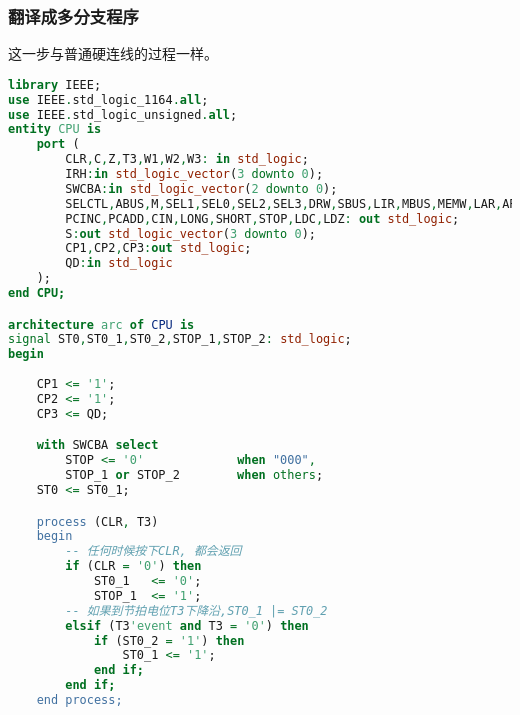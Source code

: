 \documentclass[UTF8]{ctexart}
\begin{document}
\subsubsection{翻译成多分支程序}
这一步与普通硬连线的过程一样。\\
{\firacode
\begin{lstlisting}[language={VHDL}]
library IEEE;
use IEEE.std_logic_1164.all;
use IEEE.std_logic_unsigned.all;
entity CPU is
	port (
		CLR,C,Z,T3,W1,W2,W3: in std_logic;
		IRH:in std_logic_vector(3 downto 0);
		SWCBA:in std_logic_vector(2 downto 0);
		SELCTL,ABUS,M,SEL1,SEL0,SEL2,SEL3,DRW,SBUS,LIR,MBUS,MEMW,LAR,ARINC,LPC,
		PCINC,PCADD,CIN,LONG,SHORT,STOP,LDC,LDZ: out std_logic;
		S:out std_logic_vector(3 downto 0);
		CP1,CP2,CP3:out std_logic;	
		QD:in std_logic	
	);
end CPU;

architecture arc of CPU is
signal ST0,ST0_1,ST0_2,STOP_1,STOP_2: std_logic;
begin
	
	CP1 <= '1';
	CP2 <= '1';
	CP3 <= QD;

	with SWCBA select
		STOP <= '0'             when "000",
		STOP_1 or STOP_2        when others;
	ST0 <= ST0_1;

	process (CLR, T3)
	begin
		-- 任何时候按下CLR, 都会返回
		if (CLR = '0') then
			ST0_1	<= '0';
			STOP_1	<= '1';
		-- 如果到节拍电位T3下降沿,ST0_1 |= ST0_2
		elsif (T3'event and T3 = '0') then
			if (ST0_2 = '1') then
				ST0_1 <= '1';
			end if;
		end if;
	end process;


\end{lstlisting}}
\end{document}
